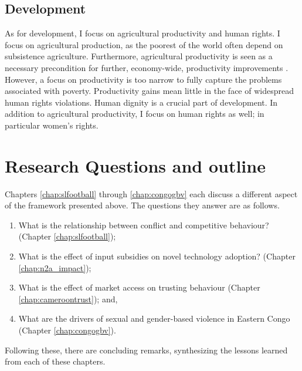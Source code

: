 \subsection{Development}
As for development, I focus on agricultural productivity and human rights. I focus on agricultural production, as the poorest of the world often depend on subsistence agriculture. Furthermore, agricultural productivity is seen as a necessary precondition for further, economy-wide, productivity improvements \cite{WorldBank2008}. However, a focus on productivity is too narrow to fully capture the problems associated with poverty. Productivity gains mean little in the face of widespread human rights violations. Human dignity is a crucial part of development. In addition to agricultural productivity, I focus on human rights as well; in particular women's rights.



\section{Research Questions and outline}
Chapters \ref{chap:slfootball} through \ref{chap:congogbv} each discuss a different aspect of the framework presented above. The questions they answer are as follows.
\begin{enumerate}
	\item What is the relationship between conflict and competitive behaviour? (Chapter \ref{chap:slfootball});
	\item What is the effect of input subsidies on novel technology adoption? (Chapter \ref{chap:n2a_impact});
	\item What is the effect of market access on trusting behaviour (Chapter \ref{chap:cameroontrust}); and,
	\item What are the drivers of sexual and gender-based violence in Eastern Congo (Chapter \ref{chap:congogbv}).
\end{enumerate}

Following these, there are concluding remarks, synthesizing the lessons learned from each of these chapters.

\clearpage 

